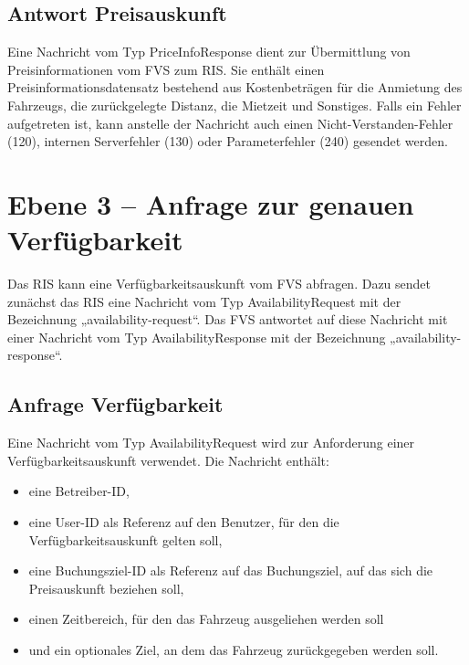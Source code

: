 

\subsection{Antwort Preisauskunft}
Eine Nachricht vom Typ PriceInfoResponse dient zur Übermittlung von Preisinformationen vom FVS zum RIS. Sie enthält einen Preisinformationsdatensatz bestehend aus Kostenbeträgen für die Anmietung des Fahrzeugs, die zurückgelegte Distanz, die Mietzeit und Sonstiges. Falls ein Fehler aufgetreten ist, kann anstelle der Nachricht auch einen Nicht-Verstanden-Fehler (120), internen Serverfehler (130) oder Parameterfehler (240) gesendet werden.




\section{Ebene 3 -- Anfrage zur genauen Verfügbarkeit}
Das RIS kann eine Verfügbarkeitsauskunft vom FVS abfragen. Dazu sendet zunächst das RIS eine Nachricht vom Typ AvailabilityRequest mit der Bezeichnung „availability-request“. Das FVS antwortet auf diese Nachricht mit einer Nachricht vom Typ AvailabilityResponse mit der Bezeichnung „availability-response“.



\subsection{Anfrage Verfügbarkeit}
Eine Nachricht vom Typ AvailabilityRequest wird zur Anforderung einer Verfügbarkeitsauskunft verwendet. Die Nachricht enthält:
\begin{itemize}
\item eine Betreiber-ID,
\item eine User-ID als Referenz auf den Benutzer, für den die Verfügbarkeitsauskunft gelten soll,
\item eine Buchungsziel-ID als Referenz auf das Buchungsziel, auf das sich die Preisauskunft beziehen soll,
\item einen Zeitbereich, für den das Fahrzeug ausgeliehen werden soll
\item und ein optionales Ziel, an dem das Fahrzeug zurückgegeben werden soll.
\end{itemize}

